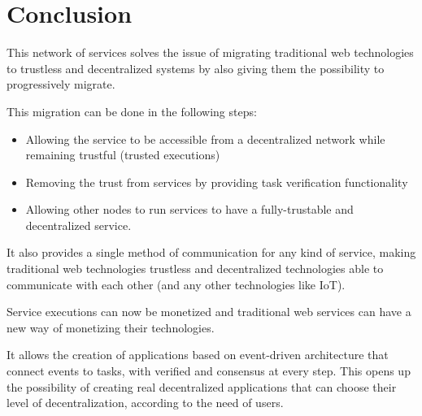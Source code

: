 \documentclass{article}
\begin{document}
\section{Conclusion}

This network of services solves the issue of migrating traditional web technologies to trustless and decentralized systems by also giving them the possibility to progressively migrate.

This migration can be done in the following steps:

\begin{itemize}
\item Allowing the service to be accessible from a decentralized network while remaining trustful (trusted executions)
\item Removing the trust from services by providing task verification functionality
\item Allowing other nodes to run services to have a fully-trustable and decentralized service.
\end{itemize}

It also provides a single method of communication for any kind of service, making traditional web technologies trustless and decentralized technologies able to communicate with each other (and any other technologies like IoT).

Service executions can now be monetized and traditional web services can have a new way of monetizing their technologies. 

It allows the creation of applications based on event-driven architecture that connect events to tasks, with verified and consensus at every step. This opens up the possibility of creating real decentralized applications that can choose their level of decentralization, according to the need of users.
\end{document}
